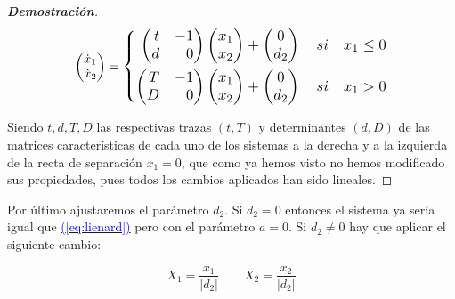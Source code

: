 \documentclass[12pt,a4paper]{report} %
\newcommand{\eref}[1]{\hyperref[#1]{\textcolor{blue}{(\ref*{#1})}}}
\newcommand{\eref}[1]{\hyperref[#1]{\textcolor{blue}{\textit{(\ref*{#1})}}}}
\begin{document}
\begin{proof}[\textbf{Demostración}]
	\begin{equation}
		\begin{pmatrix*}[r]
			\dot{x}_1 \\ \dot{x}_2
		\end{pmatrix*}=
		\label{eq:lienard2}
		\scalebox{1.2}{$\displaystyle
			\left\{
			\begin{aligned}
				\begin{pmatrix*}[r]
					t & -1\\
					d & 0
				\end{pmatrix*}\begin{pmatrix*}[r]
				x_1 \\ x_2
				\end{pmatrix*}+\begin{pmatrix}
					0\\d_2
				\end{pmatrix} \quad si \quad x_1\leq 0 \\
				\begin{pmatrix*}[r]
					T & -1\\
					D & 0
				\end{pmatrix*}\begin{pmatrix*}[r]
				x_1 \\ x_2
				\end{pmatrix*}+\begin{pmatrix}
					0\\d_2
				\end{pmatrix} \quad si \quad x_1 > 0
			\end{aligned}
			\right. 
			$}
	\end{equation}\smallskip

	\noindent Siendo $t,d,T,D$ las respectivas trazas $(t,T)$ y determinantes $(d,D)$ de las matrices características de cada uno de los sistemas a la derecha y a la izquierda de la recta de separación $x_1=0$, que como ya hemos visto no hemos modificado sus propiedades, pues todos los cambios aplicados han sido lineales.
	
\end{proof}

\newpage

	 Por último ajustaremos el parámetro $d_2$. Si $d_2=0$ entonces el sistema ya sería igual que \eref{eq:lienard} pero con el parámetro $a=0$. Si $d_2\neq0$ hay que aplicar el siguiente cambio:
	
	\begin{equation}
		\label{eq:cambiod2}
		X_1=\frac{x_1}{|d_2|} \qquad X_2=\frac{x_2}{|d_2|}
	\end{equation}\smallskip
	
\end{document}
